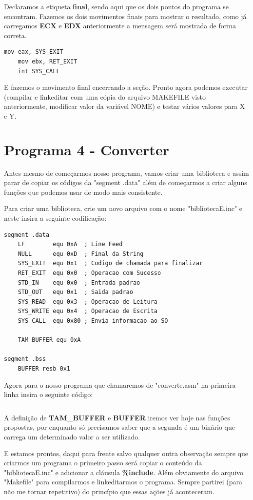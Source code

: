 Declaramos a etiqueta \textbf{final}, sendo aqui que os dois pontos do programa se encontram. Fazemos os dois movimentos finais para mostrar o resultado, como já carregamos \textbf{ECX} e \textbf{EDX} anteriormente a mensagem será mostrada de forma correta.

\begin{lstlisting}[]
	mov eax, SYS_EXIT
	mov ebx, RET_EXIT
	int SYS_CALL 
\end{lstlisting}

E fazemos o movimento final encerrando a seção. Pronto agora podemos executar (compilar e linkeditar com uma cópia do arquivo MAKEFILE visto anteriormente, modificar valor da variável NOME) e testar vários valores para X e Y.

\section{Programa 4 - Converter}
Antes mesmo de começarmos nosso programa, vamos criar uma biblioteca e assim parar de copiar os códigos da "segment .data" além de começarmos a criar alguns funções que podemos usar de modo mais consistente.

Para criar uma biblioteca, crie um novo arquivo com o nome "bibliotecaE.inc" e neste insira a seguinte codificação:
\begin{lstlisting}[]
segment .data
	LF        equ 0xA  ; Line Feed
	NULL      equ 0xD  ; Final da String
	SYS_EXIT  equ 0x1  ; Codigo de chamada para finalizar
	RET_EXIT  equ 0x0  ; Operacao com Sucesso
	STD_IN    equ 0x0  ; Entrada padrao
	STD_OUT   equ 0x1  ; Saida padrao
	SYS_READ  equ 0x3  ; Operacao de Leitura
	SYS_WRITE equ 0x4  ; Operacao de Escrita
	SYS_CALL  equ 0x80 ; Envia informacao ao SO

  	TAM_BUFFER equ 0xA

segment .bss
	BUFFER resb 0x1
\end{lstlisting}

Agora para o nosso programa que chamaremos de "converte.asm" na primeira linha insira o seguinte código:
\begin{lstlisting}[]
%include 'bibliotecaE.inc'
\end{lstlisting}

A definição de \textbf{TAM\_BUFFER} e \textbf{BUFFER} iremos ver hoje nas funções propostas, por enquanto só precisamos saber que a segunda é um binário que carrega um determinado valor a ser utilizado.

E estamos prontos, daqui para frente salvo qualquer outra observação sempre que criarmos um programa o primeiro passo será copiar o conteúdo da "bibliotecaE.inc" e adicionar a cláusula \textbf{\%include}. Além obviamente do arquivo "Makefile" para compilarmos e linkeditarmos o programa. Sempre partirei (para não me tornar repetitivo) do princípio que essas ações já aconteceram.

